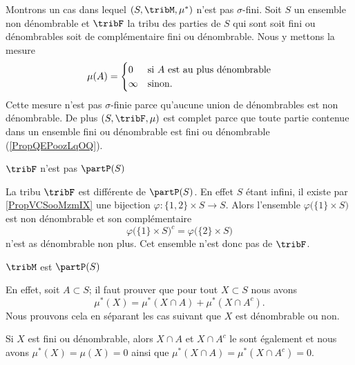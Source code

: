 \begin{example} \label{ExOIXoosScTC}
    Montrons un cas dans lequel \( (S,\tribM,\mu^*)\) n'est pas \( \sigma\)-fini. Soit \( S\) un ensemble non dénombrable et \( \tribF\) la tribu des parties de \( S\) qui sont soit fini ou dénombrables soit de complémentaire fini ou dénombrable. Nous y mettons la mesure
    \begin{equation}
        \mu(A)=\begin{cases}
            0    &   \text{si \( A\) est au plus dénombrable}\\
            \infty    &    \text{sinon}.
        \end{cases}
    \end{equation}
    Cette mesure n'est pas \( \sigma\)-finie parce qu'aucune union de dénombrables est non dénombrable. De plus \( (S,\tribF,\mu)\) est complet parce que toute partie contenue dans un ensemble fini ou dénombrable est fini ou dénombrable (\ref{PropQEPoozLqOQ}).

    \begin{subproof}
     \item[\( \tribF\) n'est pas \( \partP(S)\)]
    
        La tribu \( \tribF\) est différente de \( \partP(S)\). En effet \( S\) étant infini, il existe par \ref{PropVCSooMzmIX} une bijection \( \varphi\colon \{ 1,2 \}\times S\to S\). Alors l'ensemble \( \varphi\big( \{ 1 \}\times S \big)\) est non dénombrable et son complémentaire
        \begin{equation}
            \varphi\big( \{ 1 \}\times S \big)^c=\varphi\big( \{ 2 \}\times S \big)
        \end{equation}
        n'est as dénombrable non plus. Cet ensemble n'est donc pas de \( \tribF\).

    \item[\( \tribM\) est \( \partP(S)\)]

        En effet, soit \( A\subset S\); il faut prouver que pour tout \( X\subset S\) nous avons
        \begin{equation}
            \mu^*(X)=\mu^*(X\cap A)+\mu^*(X\cap A^c).
        \end{equation}
        Nous prouvons cela en séparant les cas suivant que \( X\) est dénombrable ou non.

        Si \( X\) est fini ou dénombrable, alors \( X\cap A\) et \( X\cap A^c\) le sont également et nous avons \( \mu^*(X)=\mu(X)=0\) ainsi que \( \mu^*(X\cap A)=\mu^*(X\cap A^c)=0\).
        

\end{subproof}
\end{example}
